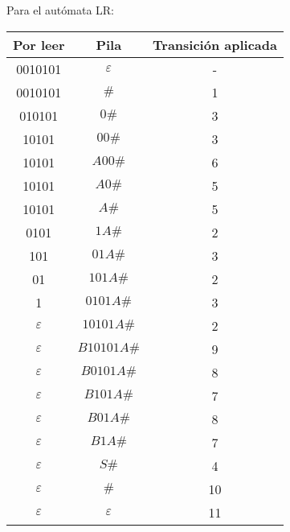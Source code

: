 \documentclass[11pt,fleqn]{article}
\begin{document}
\begin{enumerate}
\begin{enumerate}
        Para el autómata LR:
        \begin{center}
            \begin{tabular}{c|c|c}
                \hline 
                Por leer & Pila & Transición aplicada \\ 
                \hline 
                0010101 & $\varepsilon$ & - \\ 
                \hline 
                0010101 & $\#$ & 1 \\ 
                \hline
                010101 & $0\#$ & 3 \\ 
                \hline
                10101 & $00\#$ & 3 \\ 
                \hline
                10101 & $A00\#$ & 6 \\ 
                \hline
                10101 & $A0\#$ & 5 \\ 
                \hline
                10101 & $A\#$ & 5 \\ 
                \hline
                0101 & $1A\#$ & 2 \\ 
                \hline
                101 & $01A\#$ & 3 \\ 
                \hline
                01 & $101A\#$ & 2 \\ 
                \hline
                1 & $0101A\#$ & 3 \\ 
                \hline
                $\varepsilon$ & $10101A\#$ & 2 \\ 
                \hline
                $\varepsilon$ & $B10101A\#$ & 9 \\ 
                \hline
                $\varepsilon$ & $B0101A\#$ & 8 \\ 
                \hline
                $\varepsilon$ & $B101A\#$ & 7 \\ 
                \hline
                $\varepsilon$ & $B01A\#$ & 8 \\ 
                \hline
                $\varepsilon$ & $B1A\#$ & 7 \\ 
                \hline
                $\varepsilon$ & $S\#$ & 4 \\ 
                \hline
                $\varepsilon$ & $\#$ & 10 \\ 
                \hline
                $\varepsilon$ & $\varepsilon$ & 11 \\ 
                \hline
            \end{tabular} 
        \end{center} \vspace{0.3cm}
        

\end{enumerate}
\end{enumerate}
\end{document}
